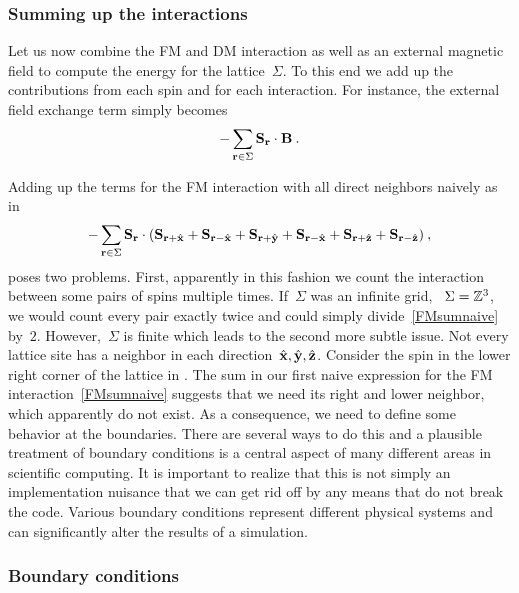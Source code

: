 \subsubsection{Summing up the interactions}

Let us now combine the FM and DM interaction as well as an external magnetic
field to compute the energy for the lattice~$\Sigma$. To this end we add up the
contributions from each spin and for each interaction. For instance, the
external field exchange term simply becomes
%
\begin{equation}\label{Bsum}
  -\sum_{\mathbf{r} \in \Sigma} \mathbf{S}_{\mathbf{r}} \cdot \mathbf{B}\:.
\end{equation}
%

Adding up the terms for the FM interaction with all direct neighbors naively as
in
%
\begin{equation}\label{FMsumnaive}
  -\sum_{\mathbf{r} \in \Sigma} \mathbf{S}_{\mathbf{r}} \cdot (\mathbf{S}_{\mathbf{r} + \hat{\mathbf{x}}} + \mathbf{S}_{\mathbf{r} - \hat{\mathbf{x}}} +
    \mathbf{S}_{\mathbf{r} + \hat{\mathbf{y}}} + \mathbf{S}_{\mathbf{r} - \hat{\mathbf{x}}} + \mathbf{S}_{\mathbf{r} + \hat{\mathbf{z}}} + \mathbf{S}_{\mathbf{r} - \hat{\mathbf{z}}})\:,
\end{equation}
%
poses two problems. First, apparently in this fashion we count the interaction
between some pairs of spins multiple times. If~$\Sigma$ was an infinite grid,
\ie{}~$\Sigma=\mathbb{Z}^3$, we would count every pair exactly twice and could simply
divide~\eqref{FMsumnaive} by~$2$. However,~$\Sigma$ is finite which leads
to the second more subtle issue. Not every lattice site has a neighbor in each
direction~$\hat{\mathbf{x}}, \hat{\mathbf{y}}, \hat{\mathbf{z}}$. Consider the spin in the lower right corner of the
lattice in . The sum in our first naive expression for the
FM interaction~\eqref{FMsumnaive} suggests that we need its right and lower
neighbor, which apparently do not exist. As a consequence, we need to define
some behavior at the boundaries. There are several ways to do this and a
plausible treatment of boundary conditions is a central aspect of many different
areas in scientific computing. It is important to realize that this is not
simply an implementation nuisance that we can get rid off by any means that do
not break the code. Various boundary conditions represent different physical
systems and can significantly alter the results of a simulation.

\subsubsection{Boundary conditions}

